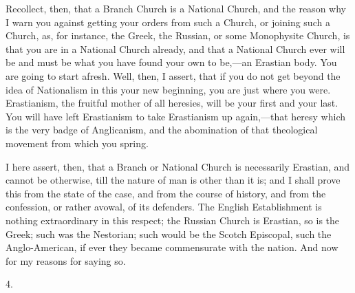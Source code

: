 Recollect, then, that a Branch Church is a National Church, and the
reason why I warn you against getting your orders from such a Church,
or joining such a Church, as, for instance, the Greek, the Russian, or
some Monophysite Church, is that you are in a National Church already,
and that a National Church ever will be and must be what you have
found your own to be,—an Erastian body. You are going to start
afresh. Well, then, I assert, that if you do not get beyond the idea
of Nationalism in this your new beginning, you are just where you
were. Erastianism, the fruitful mother of all heresies, will be your
first and your last. You will have left Erastianism to take
Erastianism up again,—that heresy which is the very badge of
Anglicanism, and the abomination of that theological movement from
which you spring.

I here assert, then, that a Branch or National Church is
necessarily Erastian, and cannot be otherwise, till the nature of man
is other than it is; and I shall prove this from the state of the
case, and from the course of history, and from the confession, or
rather avowal, of its defenders. The English Establishment is nothing
extraordinary in this respect; the Russian Church is Erastian, so is
the Greek; such was the Nestorian; such would be the Scotch Episcopal,
such the Anglo-American, if ever they became commensurate with the
nation. And now for my reasons for saying so.

4.

